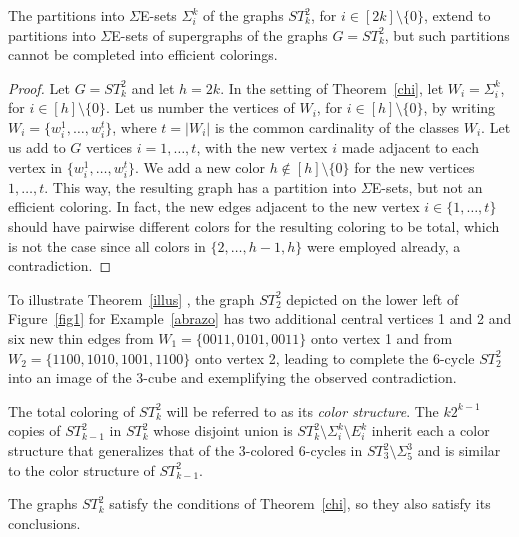 \documentclass[12pt,reqno]{article}
\begin{document}
\begin{theorem}\label{illus} The 
partitions into $\Sigma$E-sets $\Sigma_i^k$
of the graphs $ST^2_k$, for $i\in[2k]\setminus\{0\}$, extend to partitions into $\Sigma$E-sets of supergraphs of the graphs $G=ST^2_k$, but such partitions cannot be completed into efficient colorings.
\end{theorem}

\begin{proof} Let $G=ST^2_k$ and let $h=2k$.
In the setting of Theorem~\ref{chi}, let $W_i=\Sigma_i^k$, for $i\in[h]\setminus\{0\}$. 
Let us number the vertices of $W_i$, for $i\in[h]\setminus\{0\}$, by writing $W_i=\{w_i^1,\ldots,w_i^t\}$, where $t=|W_i|$ is the common cardinality of the classes $W_i$. Let us add to $G$ vertices $i=1,\ldots,t$, with the new vertex $i$ made adjacent to each vertex in $\{w_i^1,\ldots,w_i^t\}$. We add a new color $h\notin[h]\setminus\{0\}$ for the new vertices $1,\ldots,t$. This way, the resulting graph has a partition into $\Sigma$E-sets, but not an efficient coloring. In fact, the new edges adjacent to the new vertex $i\in\{1,\ldots,t\}$ should have pairwise different colors for the resulting coloring to be total, which is not the case since all colors in $\{2,\ldots,h-1,h\}$ were employed already, a contradiction.
\end{proof}

\begin{example}\label{sigue}
 To illustrate Theorem~\ref{illus} , the graph $ST_2^2$ depicted on the lower left of Figure~\ref{fig1} for Example~\ref{abrazo} has two additional central vertices 1 and 2 and six new thin edges from $W_1=\{0011,0101,0011\}$ onto vertex 1 and from $W_2=\{1100,1010,1001,1100\}$ onto vertex 2, leading to complete the 6-cycle $ST_2^2$ into an image of the 3-cube and exemplifying the observed contradiction.
\end{example}

\begin{remark}\label{occur} The total coloring of $ST^2_k$ will be referred to as its {\it color structure}. 
The $k2^{k-1}$ copies of $ST^2_{k-1}$ in $ST^2_k$ whose disjoint union is $ST^2_k\setminus\Sigma_i^k\setminus E_i^k$ inherit each a color structure that generalizes that of the 3-colored 6-cycles in $ST^2_3\setminus\Sigma_5^3$ and is similar to the color structure of $ST^2_{k-1}$.
\end{remark}

\begin{theorem}\label{app} The graphs $ST^2_k$ satisfy the conditions of Theorem~\ref{chi}, so they also satisfy its conclusions. 
\end{theorem}
\end{document}
